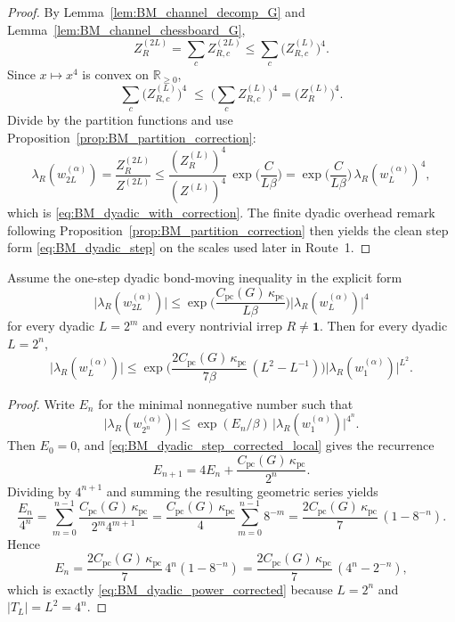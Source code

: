 \begin{proof}
By Lemma~\ref{lem:BM_channel_decomp_G} and Lemma~\ref{lem:BM_channel_chessboard_G},
\[
Z^{(2L)}_{R}=\sum_c Z^{(2L)}_{R,c}\le \sum_c \bigl(Z^{(L)}_{R,c}\bigr)^4.
\]
Since $x\mapsto x^4$ is convex on $\mathbb R_{\ge 0}$,
\begin{equation}\label{eq:BM_recombine}
\sum_c \bigl(Z^{(L)}_{R,c}\bigr)^4 \;\le\;\Big(\sum_c Z^{(L)}_{R,c}\Big)^4=\bigl(Z^{(L)}_{R}\bigr)^4.
\end{equation}
Divide by the partition functions and use Proposition~\ref{prop:BM_partition_correction}:
\[
\lambda_R(w^{(\alpha)}_{2L})=\frac{Z^{(2L)}_{R}}{Z^{(2L)}}\le 
\frac{(Z^{(L)}_{R})^4}{(Z^{(L)})^4}\,\exp\!\Big(\frac{C}{L\beta}\Big)
=\exp\!\Big(\frac{C}{L\beta}\Big)\,\lambda_R(w^{(\alpha)}_{L})^4,
\]
which is \eqref{eq:BM_dyadic_with_correction}.
The finite dyadic overhead remark following Proposition~\ref{prop:BM_partition_correction} then yields the clean step form \eqref{eq:BM_dyadic_step} on the scales used later in Route~1.
\end{proof}

\begin{lemma}\label{lem:BM_dyadic_iter_corrected}
Assume the one-step dyadic bond-moving inequality in the explicit form
\begin{equation}\label{eq:BM_dyadic_step_corrected_local}
\big|\lambda_R(w_{2L}^{(\alpha)})\big|
\le
\exp\!\Big(\frac{C_{\mathrm{pc}}(G)\,\kappa_{\mathrm{pc}}}{L\beta}\Big)
\big|\lambda_R(w_L^{(\alpha)})\big|^{4}
\end{equation}
for every dyadic $L=2^m$ and every nontrivial irrep $R\neq\mathbf 1$.
Then for every dyadic $L=2^n$,
\begin{equation}\label{eq:BM_dyadic_power_corrected}
\big|\lambda_R(w_{L}^{(\alpha)})\big|
\le
\exp\!\Big(\frac{2C_{\mathrm{pc}}(G)\,\kappa_{\mathrm{pc}}}{7\beta}\,(L^2-L^{-1})\Big)
\big|\lambda_R(w_1^{(\alpha)})\big|^{L^2}.
\end{equation}
\end{lemma}

\begin{proof}
Write $E_n$ for the minimal nonnegative number such that
\[
\big|\lambda_R(w_{2^n}^{(\alpha)})\big|
\le
\exp(E_n/\beta)\,\big|\lambda_R(w_1^{(\alpha)})\big|^{4^n}.
\]
Then $E_0=0$, and \eqref{eq:BM_dyadic_step_corrected_local} gives the recurrence
\[
E_{n+1}=4E_n+\frac{C_{\mathrm{pc}}(G)\,\kappa_{\mathrm{pc}}}{2^n}.
\]
Dividing by $4^{n+1}$ and summing the resulting geometric series yields
\[
\frac{E_n}{4^n}
=\sum_{m=0}^{n-1}\frac{C_{\mathrm{pc}}(G)\,\kappa_{\mathrm{pc}}}{2^m4^{m+1}}
=\frac{C_{\mathrm{pc}}(G)\,\kappa_{\mathrm{pc}}}{4}\sum_{m=0}^{n-1}8^{-m}
=\frac{2C_{\mathrm{pc}}(G)\,\kappa_{\mathrm{pc}}}{7}\,(1-8^{-n}).
\]
Hence
\[
E_n=\frac{2C_{\mathrm{pc}}(G)\,\kappa_{\mathrm{pc}}}{7}\,4^n(1-8^{-n})
=\frac{2C_{\mathrm{pc}}(G)\,\kappa_{\mathrm{pc}}}{7}\,(4^n-2^{-n}),
\]
which is exactly \eqref{eq:BM_dyadic_power_corrected} because $L=2^n$ and $|T_L|=L^2=4^n$.
\end{proof}

